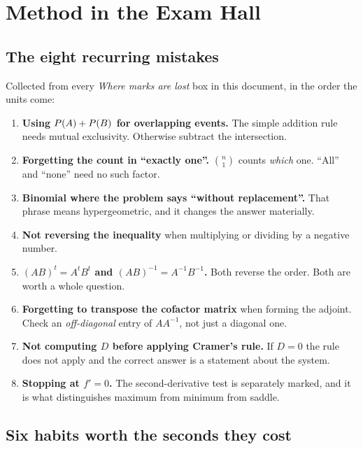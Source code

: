 \chapter{Method in the Exam Hall}

\section{The eight recurring mistakes}

Collected from every \emph{Where marks are lost} box in this document, in the
order the units come:

\begin{enumerate}
  \item \textbf{Using $P\!\left(A\right)+P\!\left(B\right)$ for overlapping events.} The simple
        addition rule needs mutual exclusivity. Otherwise subtract the
        intersection.
  \item \textbf{Forgetting the count in ``exactly one''.} $\binom{n}{1}$ counts
        \emph{which} one. ``All'' and ``none'' need no such factor.
  \item \textbf{Binomial where the problem says ``without replacement''.} That
        phrase means hypergeometric, and it changes the answer materially.
  \item \textbf{Not reversing the inequality} when multiplying or dividing by a
        negative number.
  \item \textbf{$(AB)^{t}=A^{t}B^{t}$ and $(AB)^{-1}=A^{-1}B^{-1}$.} Both
        reverse the order. Both are worth a whole question.
  \item \textbf{Forgetting to transpose the cofactor matrix} when forming the
        adjoint. Check an \emph{off-diagonal} entry of $AA^{-1}$, not just a
        diagonal one.
  \item \textbf{Not computing $D$ before applying Cramer's rule.} If $D=0$ the
        rule does not apply and the correct answer is a statement about the
        system.
  \item \textbf{Stopping at $f'=0$.} The second-derivative test is separately
        marked, and it is what distinguishes maximum from minimum from saddle.
\end{enumerate}

\section{Six habits worth the seconds they cost}

